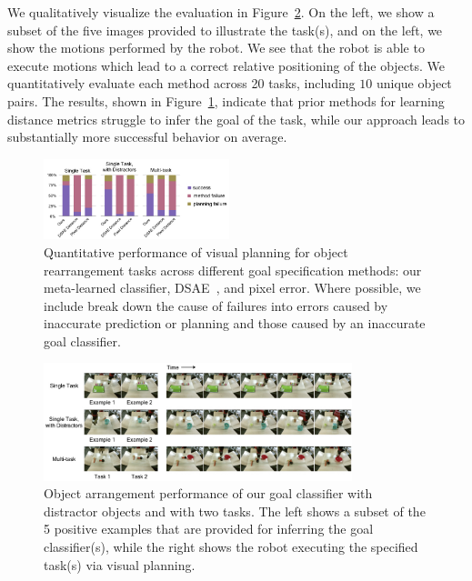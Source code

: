 We qualitatively visualize the evaluation in Figure~\ref{fig:cls_results}. On the left, we show a subset of the five images provided to illustrate the task(s), and on the left, we show the motions performed by the robot. We see that the robot is able to execute motions which lead to a correct relative positioning of the objects.
We quantitatively evaluate each method across 20 tasks, including $10$ unique object pairs. The results, shown in Figure~\ref{fig:cls_charts}, indicate that prior methods for learning distance metrics struggle to infer the goal of the task, while our approach leads to substantially more successful behavior on average. 

\begin{figure}
    \centering
    \includegraphics[width=0.48\textwidth]{images_cls/cls_charts.jpeg}
    \caption{\small Quantitative performance of visual planning for object rearrangement tasks across different goal specification methods: our meta-learned classifier, DSAE~\cite{finn2016deep}, and pixel error. Where possible, we include break down the cause of failures into errors caused by inaccurate prediction or planning and those caused by an inaccurate goal classifier.}
    \label{fig:cls_charts}
    \vspace{-0.3cm}
\end{figure}


\begin{figure}
    \centering
    \includegraphics[width=0.8\textwidth]{images_cls/cls_results.jpeg}
    \caption{\small Object arrangement performance of our goal classifier with distractor objects and with two tasks. The left shows a subset of the 5 positive examples that are provided for inferring the goal classifier(s), while the right shows the robot executing the specified task(s) via visual planning.}
    \label{fig:cls_results}
    \vspace{-0.3cm}
\end{figure}
